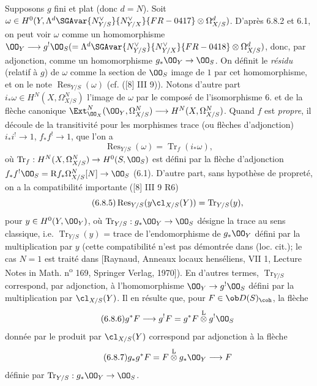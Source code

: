 Supposons $g$ fini et plat (donc $d=N$). Soit $\omega\in H^0(Y,\Lambda^d \SGAvar{N_{Y/S}^{\vee}}{N_{Y/X}^{\vee}}{FR-0417}\otimes\Omega^d_{X/S})$. D'après 6.8.2 et 6.1, on peut voir $\omega$ comme un homomorphisme $\OO_Y\longrightarrow g^!\OO_S(=\Lambda^d \SGAvar{N_{Y/S}^{\vee}}{N_{Y/X}^{\vee}}{FR-0418}\otimes\Omega^d_{X/S})$, donc, par adjonction, comme un homomorphisme $g_*\OO_Y\to\OO_S$. On définit le \emph{résidu} (relatif à $g$) de $\omega$ comme la section de $\OO_S$ image de $1$ par cet homomorphisme, et on le note $\operatorname{Res}_{Y/S}(\omega)$ (cf. ([8] III 9)). Notons d'autre part $i_*\omega\in H^N(X,\Omega^N_{X/S})$ l'image de $\omega$ par le composé de l'isomorphisme 6. et de la flèche canonique $\Ext^N_{\OO_X}(\OO_Y,\Omega^N_{X/S})\longrightarrow H^N(X,\Omega^N_{X/S})$. Quand $f$ est \emph{propre}, il découle de la transitivité pour les morphismes trace (ou flèches d'adjonction) $i_*i^!\to 1$, $f_*f^!\to 1$, que l'on a
\begin{equation}
\tag{6.8.4}
\operatorname{Res}_{Y/S}(\omega)=\operatorname{Tr}_f(i_*\omega),
\end{equation}
où $\operatorname{Tr}_f:H^N(X,\Omega^N_{X/S})\to H^0(S,\OO_S)$ est défini par la flèche d'adjonction $f_*f^!\OO_S=\mathrm{R} f_*\Omega^N_{X/S}[N]\to\OO_S$ (6.1). D'autre part, sans hypothèse de propreté, on a la compatibilité importante ([8] III 9 R6)
\begin{equation}
\tag{6.8.5}
\operatorname{Res}_{Y/S}(y\cl_{X/S}(Y))=\operatorname{Tr}_{Y/S}(y),
\end{equation}
pour $y\in H^0(Y,\OO_Y)$, où $\operatorname{Tr}_{Y/S}:g_*\OO_Y\to\OO_S$ désigne la trace au sens classique, i.e. $\operatorname{Tr}_{Y/S}(y)$ = trace de l'endomorphisme de $g_*\OO_Y$ défini par la multiplication par $y$ (cette compatibilité n'est pas démontrée dans (loc. cit.); le cas $N=1$ est traité dans [Raynaud, Anneaux locaux henséliens, VII 1, Lecture Notes in Math. n\textsuperscript{o} 169, Springer Verlag, 1970]). En d'autres termes, $\operatorname{Tr}_{Y/S}$ correspond, par adjonction, à l'homomorphisme $\OO_Y\to g^!\OO_S$ défini par la multiplication par $\cl_{X/S}(Y)$. Il en résulte que, pour $F\in\ob D(S)_{\coh}$, la flèche
\begin{equation}
\tag{6.8.6}
g^*F\longrightarrow g^!F=g^*F\overset{\mathrm{L}}{\otimes}g^!\OO_S
\end{equation}
donnée par le produit par $\cl_{X/S}(Y)$ correspond par adjonction à la flèche
\begin{equation}
\tag{6.8.7}
g_*g^*F=F\overset{\mathrm{L}}{\otimes}g_*\OO_Y\longrightarrow F
\end{equation}
définie par $\operatorname{Tr}_{Y/S}:g_*\OO_Y\to\OO_S$.



